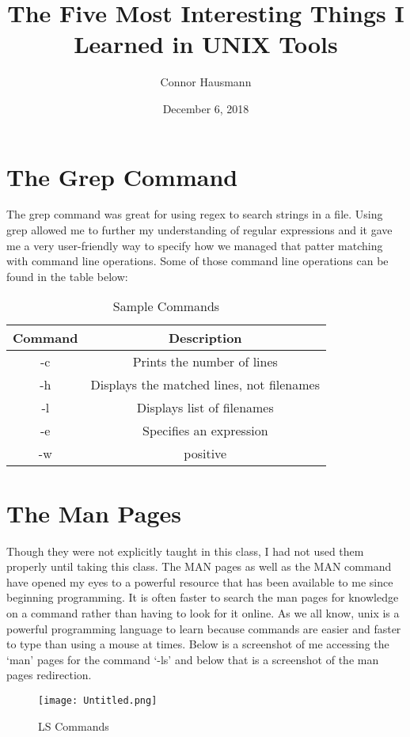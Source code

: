 \documentclass{article}
\title{The Five Most Interesting Things I Learned in UNIX Tools}
\author{Connor Hausmann }
\date{December 6, 2018}
\begin{document}
\maketitle

\section{The Grep Command}
The grep command was great for using regex to search strings in a file. Using grep allowed me to further my understanding of regular expressions and it gave me a very user-friendly way to specify how we managed that patter matching with command line operations. Some of those command line operations can be found in the table below:
\citep{Geek}

\begin{table}[h]
\caption{Sample Commands}
\begin{center}
\begin{tabular}{|c||c|}
\hline
\textbf{Command} & \textbf{Description}\\
\hline
-c & Prints the number of lines\\
\hline
-h & Displays the matched lines, not filenames\\
\hline
-l & Displays list of filenames\\
\hline
-e & Specifies an expression\\
\hline
-w & positive\\
\hline
\end{tabular}
\end{center}
\end{table}

\section{The Man Pages}
Though they were not explicitly taught in this class, I had not used them properly until taking this class. The MAN pages as well as the MAN command have opened my eyes to a powerful resource that has been available to me since beginning programming. It is often faster to search the man pages for knowledge on a command rather than having to look for it online. As we all know, unix is a powerful programming language to learn because commands are easier and faster to type than using a mouse at times. Below is a screenshot of me accessing the ‘man’ pages for the command ‘-ls’ and below 
that is a screenshot of the man pages redirection. 

\begin{figure}[h!]
\centering
\texttt{[image: Untitled.png]}
\caption{LS Commands}
\label{fig:Man Pages}
\end{figure}
\end{document}
